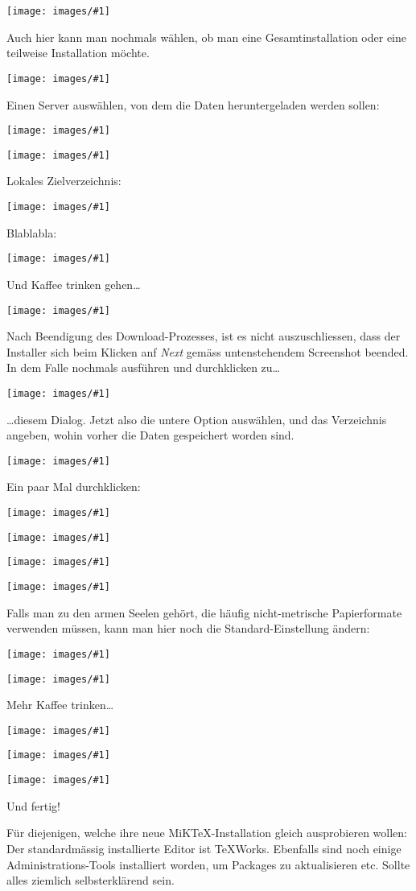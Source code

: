 \documentclass[a4paper,11pt]{article}
\def\mt{MiKTeX}
\newcommand{\screenshot}[1]{%
    \begin{minipage}{\textwidth}
        \vspace{1em}
        \centering
        \texttt{[image: images/\#1]}
        \vspace{1em}
    \end{minipage}}
\begin{document}
\screenshot{miktex01.png}

Auch hier kann man nochmals w\"ahlen, ob man eine Gesamtinstallation oder eine
teilweise Installation m\"ochte.

\screenshot{miktex02.png}

Einen Server ausw\"ahlen, von dem die Daten heruntergeladen werden sollen:

\screenshot{miktex03.png}

\screenshot{miktex04.png}

\newpage
Lokales Zielverzeichnis:

\screenshot{miktex05.png}

Blablabla:

\screenshot{miktex06.png}

\newpage
Und Kaffee trinken gehen\ldots

\screenshot{miktex07.png}

Nach Beendigung des Download-Prozesses, ist es nicht auszuschliessen, dass der
Installer sich beim Klicken anf \emph{Next} gem\"ass untenstehendem Screenshot
beended\footnotemark. In  dem  Falle  nochmals  ausf\"uhren  und  durchklicken
zu\ldots
{}

\screenshot{miktex08.png}

\newpage
\ldots  diesem  Dialog. Jetzt also  die  untere  Option ausw\"ahlen,  und  das
Verzeichnis angeben, wohin vorher die Daten gespeichert worden sind.

\screenshot{miktex09.png}

Ein paar Mal durchklicken:

\screenshot{miktex10.png}

\screenshot{miktex11.png}

\screenshot{miktex12.png}

\screenshot{miktex13.png}

Falls  man  zu  den  armen   Seelen  geh\"ort,  die  h\"aufig  nicht-metrische
Papierformate verwenden m\"ussen, kann  man hier noch die Standard-Einstellung
\"andern:

\screenshot{miktex14.png}

\screenshot{miktex15.png}

Mehr Kaffee trinken\ldots

\screenshot{miktex16.png}

\screenshot{miktex17.png}

\screenshot{miktex18.png}

Und fertig!

F\"ur  diejenigen,  welche  ihre  neue  \mt-Installation  gleich  ausprobieren
wollen: Der  standardm\"assig  installierte   Editor  ist  TeXWorks. Ebenfalls
sind  noch einige  Administrations-Tools  installiert worden,  um Packages  zu
aktualisieren etc. Sollte alles ziemlich selbsterkl\"arend sein.
\end{document}
